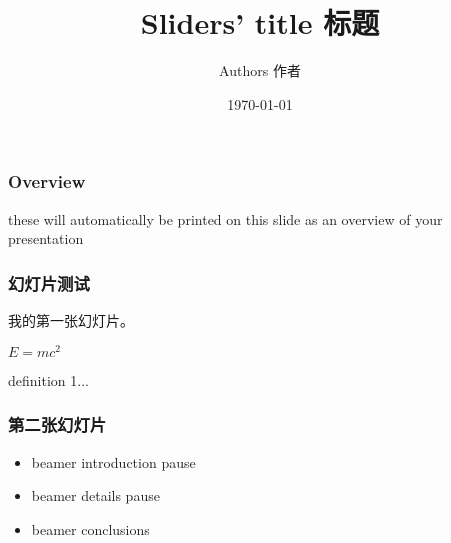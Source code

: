 \documentclass{beamer}
\begin{document}
\title{Sliders' title 标题}%
\author{Authors 作者} 
\date{\today}%
\begin{frame}
\titlepage %
\end{frame}
\begin{frame}
\frametitle{Overview} %
\tableofcontents %
these will automatically be printed on this slide as an overview of your presentation
\end{frame}
\begin{frame}
\frametitle{幻灯片测试} %
我的第一张幻灯片。
\begin{theorem}
$E = mc^2$
\end{theorem}
\begin{definition}
definition 1...%
\end{definition}
\end{frame}
\begin{frame}
 \frametitle{第二张幻灯片}
 \pause
 \begin{itemize}
 \item beamer introduction pause
 \item beamer details pause
 \item beamer conclusions
 \end{itemize}
 \end{frame}
\end{document}
